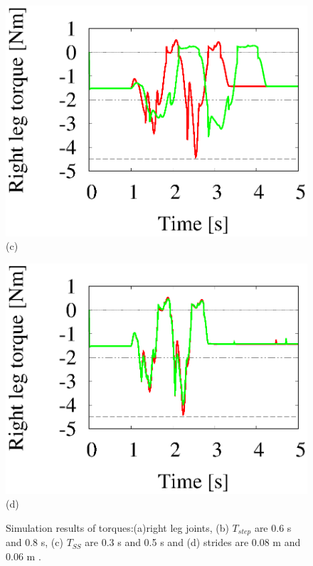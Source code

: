\documentclass[twocolumn]{jsarticle}
\begin{document}
\begin{figure}[h]
\begin{minipage}{0.49\linewidth}
    \includegraphics[width=1.0\linewidth]{./fig/TSS.eps}
     \footnotesize{\hspace{30pt}(c)}
  \end{minipage}
   \begin{minipage}{0.49\linewidth}
    \centering
    \includegraphics[width=1.0\linewidth]{./fig/hohaba.eps}
     \footnotesize{\hspace{30pt}(d)}
  \end{minipage}
  \caption{Simulation results of torques:(a)right leg joints, (b) $T_{step}$ are 0.6 s and 0.8 s, (c) $T_{SS}$ are 0.3 s and 0.5 s and (d) strides are 0.08 m and 0.06 m .}
  \label{fig:CHT1}
\end{figure}
\end{document}
